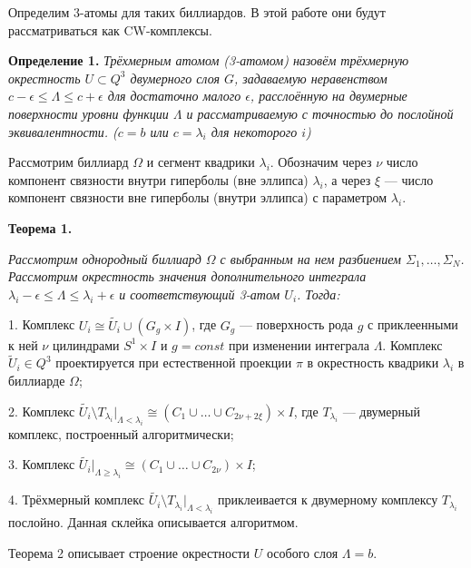 Определим 3-атомы для таких биллиардов. В этой работе они будут рассматриваться как CW-комплексы.

\textbf{Определение 1.} { \it Трёхмерным атомом (3-атомом) назо\-вём трёхмерную окрестность $U \subset Q^3$ двумерного слоя $G$, зада\-ваемую неравенством $c - \epsilon \leq \Lambda \leq c + \epsilon$ для достаточно малого $\epsilon$, расслоённую на двумерные поверхности уровни функции $\Lambda$ и рассматриваемую с точностью до послойной экви\-вален\-тности. ($c = b$ или $c = \lambda_i$ для некоторого $i$)}

Рассмотрим биллиард $\Omega$ и сегмент квадрики $\lambda_i$. Обоз\-начим через $\nu$ число компонент связности внутри гиперболы (вне эллипса) $\lambda_i$, а через $\xi$ --- число компонент связности вне гиперболы (внутри эллипса) с параметром $\lambda_i$.

\textbf{Теорема 1.}
	{\it Рассмотрим однородный биллиард $\Omega$ с выб\-ран\-ным на нем разбиением $\Sigma_1, \ldots, \Sigma_N$. Рассмотрим окрест\-ность значения дополнительного интеграла $\lambda_i - \epsilon \leq \Lambda \leq \lambda_i + \epsilon$ и соответствующий 3-атом $U_i$. Тогда:

	1. Комплекс $U_i \cong \tilde{U_i} \cup (G_g \times I)$, где $G_g$ --- поверхность рода $g$ с приклеенными к ней $\nu$ цилиндрами $S^1 \times I$ и $g = const$ при изменении интеграла $\Lambda$. Комплекс $\tilde U_i \in Q^3$ проектируется при естественной проекции $\pi$ в окрестность квадрики $\lambda_i$ в биллиарде $\Omega$;
		
	2. Комплекс $\tilde{U_i} \setminus T_{\lambda_i} |_{\Lambda < \lambda_i} \cong (C_1 \cup \ldots \cup C_{2\nu+2\xi}) \times I$, где $T_{\lambda_i} $ --- двумерный комплекс, построенный алгорит\-мически;
		
	3. Комплекс $\tilde{U_i} |_{\Lambda \geq \lambda_i} \cong (C_1 \cup \ldots \cup C_{2\nu}) \times I$;
		
		4. Трёхмерный комплекс $\tilde{U_i} \setminus T_{\lambda_i} |_{\Lambda < \lambda_i}$ прик\-леи\-вается к двумерному комплексу $T_{\lambda_i}$ послойно. Данная склей\-ка описы\-вается алгоритмом.
}

Теорема 2 описывает строение окрестности $U$ особого слоя $\Lambda = b$.

